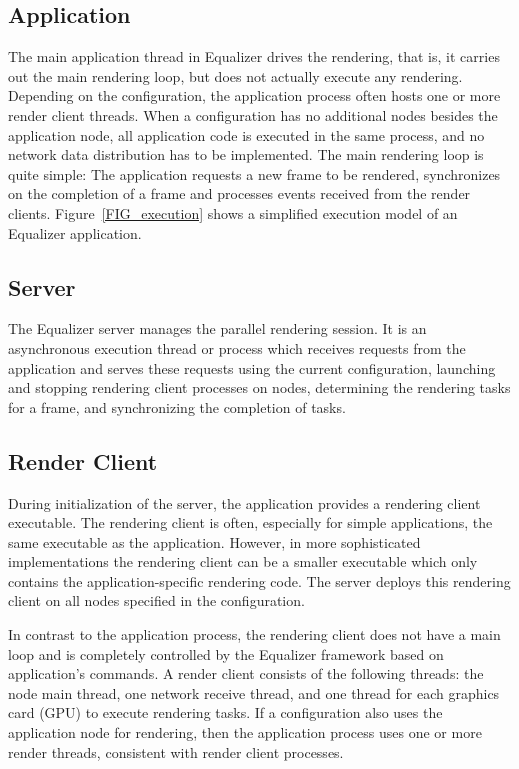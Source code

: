 \subsection{Application}

The main application thread in Equalizer drives the rendering, that is, it
carries out the main rendering loop, but does not actually execute any
rendering. Depending on the configuration, the application process often hosts
one or more render client threads. When a configuration has no additional nodes
besides the application node, all application code is executed in the same
process, and no network data distribution has to be implemented. The main
rendering loop is quite simple: The application requests a new frame to be
rendered, synchronizes on the completion of a frame and processes events
received from the render clients. Figure~\ref{FIG_execution} shows a simplified
execution model of an Equalizer application.


\subsection{Server}

The Equalizer server manages the parallel rendering session. It is an
asynchronous execution thread or process which receives requests from the
application and serves these requests using the current configuration, launching
and stopping rendering client processes on nodes, determining the rendering
tasks for a frame, and synchronizing the completion of tasks.

\subsection{Render Client}

During initialization of the server, the application provides a rendering client
executable. The rendering client is often, especially for simple applications,
the same executable as the application. However, in more sophisticated
implementations the rendering client can be a smaller executable which only
contains the application-specific rendering code. The server deploys this
rendering client on all nodes specified in the configuration.

In contrast to the application process, the rendering client does not have a
main loop and is completely controlled by the Equalizer framework based on
application's commands. A render client consists of the following threads: the
node main thread, one network receive thread, and one thread for each graphics
card (GPU) to execute rendering tasks. If a configuration also uses the
application node for rendering, then the application process uses one or more
render threads, consistent with render client processes.

